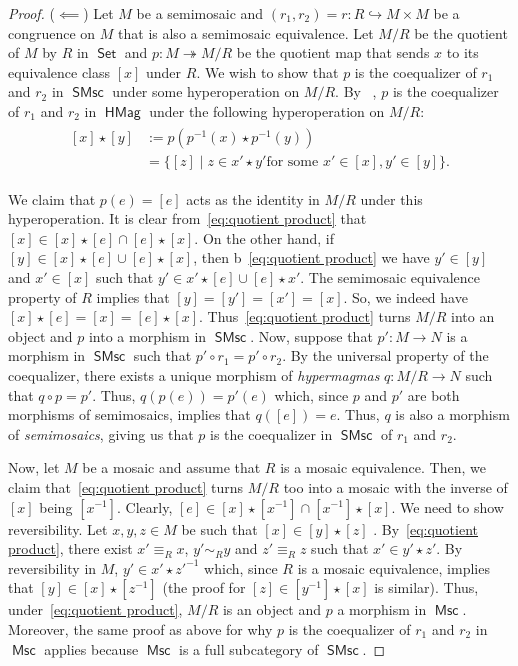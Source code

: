 \documentclass[reqno]{amsart}
\newcommand{\cat}[1]{\ensuremath{\mathsf{#1}}}
\DeclareMathOperator{\Set}{\cat{Set}}
\DeclareMathOperator{\HMag}{\cat{HMag}}
\DeclareMathOperator{\Msc}{\cat{Msc}}
\DeclareMathOperator{\SMsc}{\cat{SMsc}}
\numberwithin{equation}{section}
\theoremstyle{plain}
\theoremstyle{definition}
\begin{document}
\begin{proof}
    ($\impliedby$) Let $M$ be a semimosaic and $(r_1, r_2) = r:R\hookrightarrow M\times M$ be a congruence on $M$ that is also a semimosaic equivalence. Let $M/R$ be the quotient of $M$ by $R$ in $\Set$ and $p \colon M \twoheadrightarrow M/R$ be the quotient map that sends $x$ to its equivalence class $[x]$ under $R$. We wish to show that $p$ is the coequalizer of $r_1$ and $r_2$ in $\SMsc$ under some hyperoperation on $M/R$. By ~\cite[Proposition~3.3]{NakamuraReyes}, $p$ is the coequalizer of $r_1$ and $r_2$ in $\HMag$ under the following hyperoperation on $M/R$:
    \begin{align}
    \begin{split}
    [x] \star [y] &:= p(p^{-1}(x) \star p^{-1}(y)) \\
    &= \{[z] \mid z \in x' \star y' \mbox{for some } x' \in [x], y' \in [y]\}.
    \end{split}\label{eq:quotient product}
    \end{align}

We claim that $p(e) = [e]$ acts as the identity in $M/R$ under this hyperoperation. It is clear from~\eqref{eq:quotient product} that $[x]\in [x]\star[e] \cap [e]\star [x]$. On the other hand, if $[y] \in [x] \star[e] \cup [e]\star[x]$, then b~\eqref{eq:quotient product} we have $y' \in [y]$ and $x' \in [x]$ such that $y' \in x' \star [e] \cup [e] \star x'$. The semimosaic equivalence property of $R$ implies that $[y] = [y'] = [x'] = [x]$. So, we indeed have $[x] \star [e] = [x] = [e]\star[x]$. Thus~\eqref{eq:quotient product} turns $M/R$ into an object and $p$ into a morphism in $\SMsc$. Now, suppose that $p':M\to N$ is a morphism in $\SMsc$ such that $p'\circ r_1 = p'\circ r_2$. By the universal property of the coequalizer, there exists a unique morphism of \textit{hypermagmas} $q: M/R\to N$ such that $q\circ p = p'$. Thus, $q(p(e)) = p'(e)$ which, since $p$ and $p'$ are both morphisms of semimosaics, implies that $q([e]) = e$. Thus, $q$ is also a morphism of \textit{semimosaics}, giving us that $p$ is the coequalizer in $\SMsc$ of $r_1$ and $r_2$.

Now, let $M$ be a mosaic and assume that $R$ is a mosaic equivalence. Then, we claim that~\eqref{eq:quotient product} turns $M/R$ too into a mosaic with the inverse of $[x]$ being $[x^{-1}]$. Clearly, $[e]\in [x]\star[x^{-1}] \cap [x^{-1}]\star [x]$. We need to show reversibility. Let $x, y, z \in M$ be such that $[x]\in [y]\star[z]$ . By~\eqref{eq:quotient product}, there exist $x' \equiv_R x$, $y'\sim_R y$ and $z'\equiv_R z$ such that $x'\in y'\star z'$. By reversibility in $M$, $y'\in x' \star z'^{-1}$ which, since $R$ is a mosaic equivalence, implies that $[y]\in [x] \star [z^{-1}]$ (the proof for $[z]\in [y^{-1}]\star [x]$ is similar). Thus, under~\eqref{eq:quotient product}, $M/R$ is an object and $p$ a morphism in $\Msc$. Moreover, the same proof as above for why $p$ is the coequalizer of $r_1$ and $r_2$ in $\Msc$ applies because $\Msc$ is a full subcategory of $\SMsc$.


\end{proof}
\end{document}
